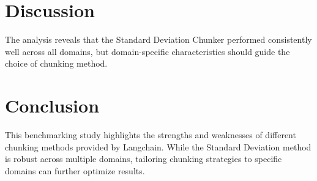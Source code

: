 \documentclass[12pt]{article}
\begin{document}
\section{Discussion}
The analysis reveals that the Standard Deviation Chunker performed consistently well across all domains, but domain-specific characteristics should guide the choice of chunking method.

\section{Conclusion}
This benchmarking study highlights the strengths and weaknesses of different chunking methods provided by Langchain. While the Standard Deviation method is robust across multiple domains, tailoring chunking strategies to specific domains can further optimize results.
\end{document}
